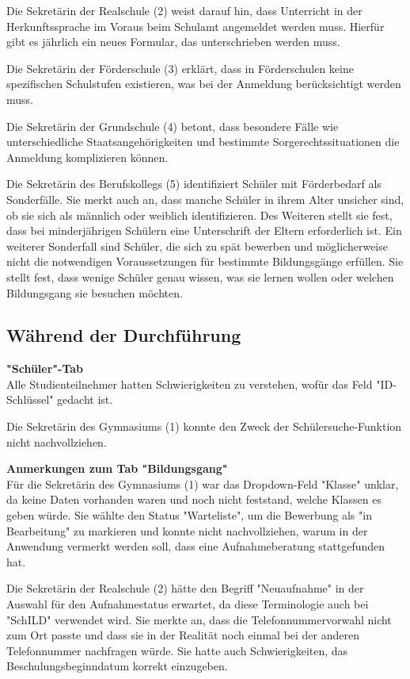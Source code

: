 Die Sekretärin der Realschule (2) weist darauf hin, dass Unterricht in der Herkunftssprache im Voraus beim Schulamt angemeldet werden muss. Hierfür gibt es jährlich ein neues Formular, das unterschrieben werden muss.

Die Sekretärin der Förderschule (3) erklärt, dass in Förderschulen keine spezifischen Schulstufen existieren, was bei der Anmeldung berücksichtigt werden muss.

Die Sekretärin der Grundschule (4) betont, dass besondere Fälle wie unterschiedliche Staatsangehörigkeiten und bestimmte Sorgerechtssituationen die Anmeldung komplizieren können.

Die Sekretärin des Berufskollegs (5) identifiziert Schüler mit Förderbedarf als Sonderfälle. Sie merkt auch an, dass manche Schüler in ihrem Alter unsicher sind, ob sie sich als männlich oder weiblich identifizieren. Des Weiteren stellt sie fest, dass bei minderjährigen Schülern eine Unterschrift der Eltern erforderlich ist. Ein weiterer Sonderfall sind Schüler, die sich zu spät bewerben und möglicherweise nicht die notwendigen Voraussetzungen für bestimmte Bildungsgänge erfüllen. Sie stellt fest, dass wenige Schüler genau wissen, was sie lernen wollen oder welchen Bildungsgang sie besuchen möchten.


\subsection{Während der Durchführung}

\textbf{"Schüler"-Tab}\\
Alle Studienteilnehmer hatten Schwierigkeiten zu verstehen, wofür das Feld "ID-Schlüssel" gedacht ist.

Die Sekretärin des Gymnasiums (1) konnte den Zweck der Schülersuche-Funktion nicht nachvollziehen.


\textbf{Anmerkungen zum Tab "Bildungsgang"}\\
Für die Sekretärin des Gymnasiums (1) war das Dropdown-Feld "Klasse" unklar, da keine Daten vorhanden waren und noch nicht feststand, welche Klassen es geben würde. Sie wählte den Status "Warteliste", um die Bewerbung als "in Bearbeitung" zu markieren und konnte nicht nachvollziehen, warum in der Anwendung vermerkt werden soll, dass eine Aufnahmeberatung stattgefunden hat.

Die Sekretärin der Realschule (2) hätte den Begriff "Neuaufnahme" in der Auswahl für den Aufnahmestatus erwartet, da diese Terminologie auch bei "SchILD" verwendet wird. Sie merkte an, dass die Telefonnummervorwahl nicht zum Ort passte und dass sie in der Realität noch einmal bei der anderen Telefonnummer nachfragen würde. Sie hatte auch Schwierigkeiten, das Beschulungsbeginndatum korrekt einzugeben.

